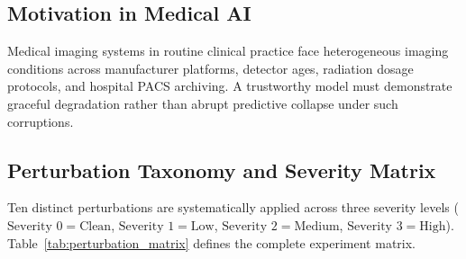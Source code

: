 \documentclass[conference]{IEEEtran}
\begin{document}
\subsection{Motivation in Medical AI}
Medical imaging systems in routine clinical practice face heterogeneous imaging conditions across manufacturer platforms, detector ages, radiation dosage protocols, and hospital PACS archiving. A trustworthy model must demonstrate graceful degradation rather than abrupt predictive collapse under such corruptions.

\subsection{Perturbation Taxonomy and Severity Matrix}
Ten distinct perturbations are systematically applied across three severity levels ($\text{Severity } 0 = \text{Clean}$, $\text{Severity } 1 = \text{Low}$, $\text{Severity } 2 = \text{Medium}$, $\text{Severity } 3 = \text{High}$). Table~\ref{tab:perturbation_matrix} defines the complete experiment matrix.
\end{document}
